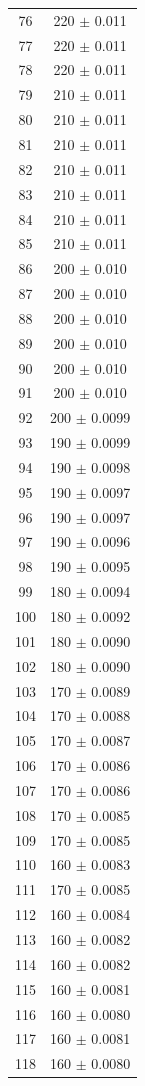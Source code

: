 \documentclass[a4paper]{instrumentacao}
\begin{document}
\begin{longtable}{cc}
 76 & 220 $\pm$ 0.011 \\
 77 & 220 $\pm$ 0.011 \\
 78 & 220 $\pm$ 0.011 \\
 79 & 210 $\pm$ 0.011 \\
 80 & 210 $\pm$ 0.011 \\
 81 & 210 $\pm$ 0.011 \\
 82 & 210 $\pm$ 0.011 \\
 83 & 210 $\pm$ 0.011 \\
 84 & 210 $\pm$ 0.011 \\
 85 & 210 $\pm$ 0.011 \\
 86 & 200 $\pm$ 0.010 \\
 87 & 200 $\pm$ 0.010 \\
 88 & 200 $\pm$ 0.010 \\
 89 & 200 $\pm$ 0.010 \\
 90 & 200 $\pm$ 0.010 \\
 91 & 200 $\pm$ 0.010 \\
 92 & 200 $\pm$ 0.0099 \\
 93 & 190 $\pm$ 0.0099 \\
 94 & 190 $\pm$ 0.0098 \\
 95 & 190 $\pm$ 0.0097 \\
 96 & 190 $\pm$ 0.0097 \\
 97 & 190 $\pm$ 0.0096 \\
 98 & 190 $\pm$ 0.0095 \\
 99 & 180 $\pm$ 0.0094 \\
 100 & 180 $\pm$ 0.0092 \\
 101 & 180 $\pm$ 0.0090 \\
 102 & 180 $\pm$ 0.0090 \\
 103 & 170 $\pm$ 0.0089 \\
 104 & 170 $\pm$ 0.0088 \\
 105 & 170 $\pm$ 0.0087 \\
 106 & 170 $\pm$ 0.0086 \\
 107 & 170 $\pm$ 0.0086 \\
 108 & 170 $\pm$ 0.0085 \\
 109 & 170 $\pm$ 0.0085 \\
 110 & 160 $\pm$ 0.0083 \\
 111 & 170 $\pm$ 0.0085 \\
 112 & 160 $\pm$ 0.0084 \\
 113 & 160 $\pm$ 0.0082 \\
 114 & 160 $\pm$ 0.0082 \\
 115 & 160 $\pm$ 0.0081 \\
 116 & 160 $\pm$ 0.0080 \\
 117 & 160 $\pm$ 0.0081 \\
 118 & 160 $\pm$ 0.0080 \\
\end{longtable}
\end{document}
